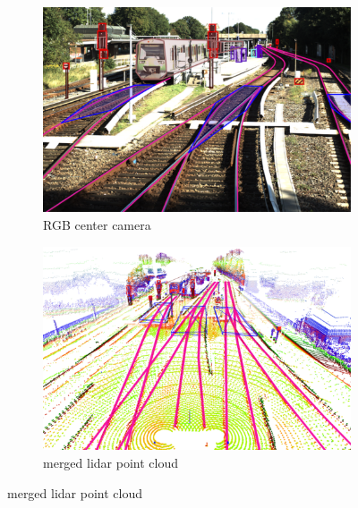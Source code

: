 \begin{figure}[H]
    \centering
    \begin{subfigure}{0.45\textwidth}
        \centering
        \includegraphics[width=\textwidth]{PICs/datasets/OSDaR23_dataset/labeled_image.png}
        \caption{\ac{RGB} center camera}
    \end{subfigure}%
    \hspace{0.05\textwidth}
    \begin{subfigure}{0.45\textwidth}
        \centering
        \includegraphics[width=\textwidth]{PICs/datasets/OSDaR23_dataset/labeled_3D.png}
        \caption{merged lidar point cloud}
    \end{subfigure}

    \vspace{0.5cm} %


\end{figure}

